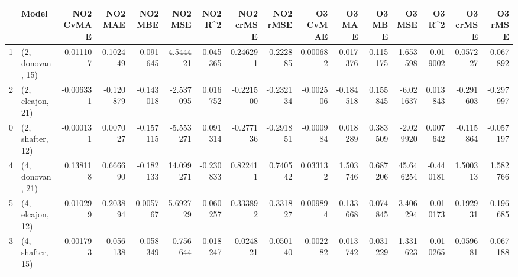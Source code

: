 \begin{tabular}{llrrrrrrrrrrrrrr}
\toprule
{} &             Model &  NO2 CvMAE &   NO2 MAE &   NO2 MBE &    NO2 MSE &   NO2 R\textasciicircum2 &  NO2 crMSE &  NO2 rMSE &  O3 CvMAE &    O3 MAE &    O3 MBE &     O3 MSE &    O3 R\textasciicircum2 &  O3 crMSE &   O3 rMSE \\
\midrule
1 &  (2, donovan, 15) &   0.011107 &  0.102449 & -0.091645 &   4.544421 & -0.045365 &   0.246291 &  0.222885 &  0.000682 &  0.017376 &  0.115175 &   1.653598 & -0.019002 &  0.057227 &  0.067892 \\
2 &  (2, elcajon, 21) &  -0.006331 & -0.120879 & -0.143018 &  -2.537095 &  0.016752 &  -0.221500 & -0.232134 & -0.002506 & -0.184518 &  0.155845 &  -6.021637 &  0.013843 & -0.291603 & -0.297997 \\
0 &  (2, shafter, 12) &  -0.000131 &  0.007027 & -0.157115 &  -5.553271 &  0.091314 &  -0.277136 & -0.291851 & -0.000984 &  0.018289 &  0.383509 &  -2.029920 &  0.007642 & -0.115864 & -0.057197 \\
4 &  (4, donovan, 21) &   0.138118 &  0.666690 & -0.182133 &  14.099271 & -0.230833 &   0.822411 &  0.740542 &  0.033132 &  1.503746 &  0.687206 &  45.646254 & -0.440181 &  1.500313 &  1.582766 \\
5 &  (4, elcajon, 12) &   0.010299 &  0.203894 &  0.005767 &   5.692729 & -0.060257 &   0.333892 &  0.331827 &  0.009894 &  0.133668 & -0.074845 &   3.406294 & -0.010173 &  0.192931 &  0.196685 \\
3 &  (4, shafter, 15) &  -0.001793 & -0.056138 & -0.058349 &  -0.756644 &  0.018247 &  -0.024821 & -0.050140 & -0.002282 & -0.013742 &  0.031229 &   1.331623 & -0.010265 &  0.059681 &  0.067188 \\
\bottomrule
\end{tabular}
